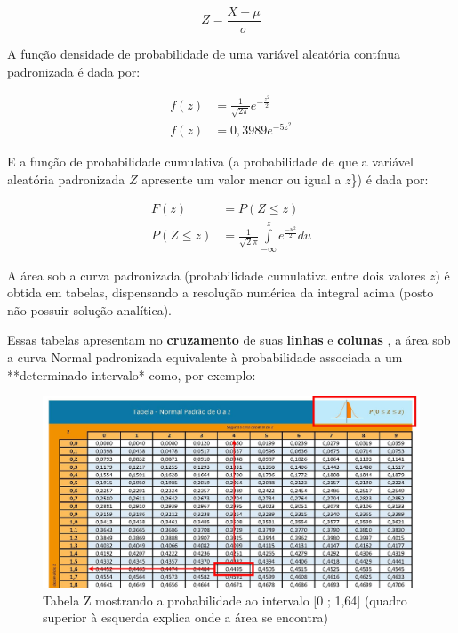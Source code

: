 \documentclass[
]{book}
\begin{document}
\[
Z = \frac{X-\mu}{\sigma}
\]

\hfill\break

A função densidade de probabilidade de uma variável aleatória contínua padronizada é dada por:

\hfill\break

\begin{align*}
f(z) & = \frac{1}{{\sqrt {2\pi } }}e^{ - \frac{{z^2 }}{2}} \\
f(z) & = 0,3989e^{ - 5z^2}    
\end{align*}

\hfill\break

E a função de probabilidade cumulativa (a probabilidade de que a variável aleatória padronizada \(Z\) apresente um valor menor ou igual a \(z\)\}) é dada por:

\hfill\break

\begin{align*}
F(z) &  = P(Z\le z) \\
P(Z\le z) &  =  \frac{1}{\sqrt{2}\pi } \underset{-\infty }{\overset{z}{\int }} e^\frac{-u^{2}}  {2}   du     
\end{align*}

\hfill\break

A área sob a curva padronizada (probabilidade cumulativa entre dois valores \(z\)) é obtida em tabelas, dispensando a resolução numérica da integral acima (posto não possuir solução analítica).

\hfill\break

Essas tabelas apresentam no \textbf{cruzamento} de suas \textbf{linhas} e \textbf{colunas} , a área sob a curva Normal padronizada equivalente à probabilidade associada a um **determinado intervalo* como, por exemplo:

\hfill\break

\begin{figure}

{\centering \includegraphics[width=1\linewidth]{images6/tabZa} 

}

\caption{Tabela Z mostrando a probabilidade ao intervalo [0 ; 1,64] (quadro superior à esquerda explica onde a área se encontra)}\label{fig:fig23}
\end{figure}
\end{document}
